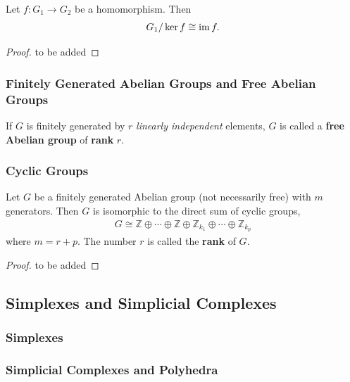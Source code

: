 \documentclass[10pt]{article}
\begin{document}
\begin{theorem}
    Let $f:G_1\to G_2$ be a homomorphism. Then
    \begin{align}
        G_1/\ker f\cong \operatorname{im} f.
    \end{align}
\end{theorem}
\begin{proof}
    to be added
\end{proof}

\subsubsection{Finitely Generated Abelian Groups and Free Abelian Groups}
\begin{definition}
    If $G$ is finitely generated by $r$ \textit{linearly independent} elements, $G$ is called a \textbf{free Abelian group} of \textbf{rank} $r$.
\end{definition}

\subsubsection{Cyclic Groups}

\begin{theorem}
    Let $G$ be a finitely generated Abelian group (not necessarily free) with $m$ generators.
    Then $G$ is isomorphic to the direct sum of cyclic groups,
    \begin{align}
        G\cong\mathbb{Z}\oplus\cdots\oplus\mathbb{Z}\oplus\mathbb{Z}_{k_1}\oplus\cdots\oplus\mathbb{Z}_{k_p}
    \end{align}
    where $m=r+p$.
    The number $r$ is called the \textbf{rank} of $G$.
\end{theorem}
\begin{proof}
    to be added
\end{proof}


\subsection{Simplexes and Simplicial Complexes}
\subsubsection{Simplexes}
\subsubsection{Simplicial Complexes and Polyhedra}
\end{document}
